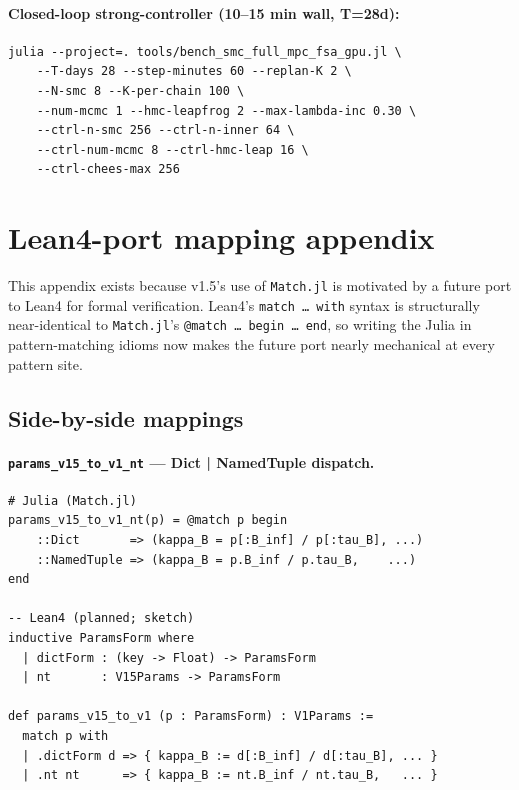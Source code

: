 \documentclass[11pt,a4paper]{article}
\begin{document}
\paragraph{Closed-loop strong-controller (10--15 min wall, T=28d):}

\begin{verbatim}
julia --project=. tools/bench_smc_full_mpc_fsa_gpu.jl \
    --T-days 28 --step-minutes 60 --replan-K 2 \
    --N-smc 8 --K-per-chain 100 \
    --num-mcmc 1 --hmc-leapfrog 2 --max-lambda-inc 0.30 \
    --ctrl-n-smc 256 --ctrl-n-inner 64 \
    --ctrl-num-mcmc 8 --ctrl-hmc-leap 16 \
    --ctrl-chees-max 256
\end{verbatim}

\section{Lean4-port mapping appendix}
\label{sec:lean4}

This appendix exists because v1.5's use of \texttt{Match.jl} is
motivated by a future port to Lean4 for formal verification. Lean4's
\texttt{match \dots\ with} syntax is structurally near-identical
to \texttt{Match.jl}'s \texttt{@match \dots\ begin \dots\ end}, so
writing the Julia in pattern-matching idioms now makes the future
port nearly mechanical at every pattern site.

\subsection{Side-by-side mappings}

\paragraph{\texttt{params\_v15\_to\_v1\_nt} — Dict | NamedTuple dispatch.}

\begin{lstlisting}
# Julia (Match.jl)
params_v15_to_v1_nt(p) = @match p begin
    ::Dict       => (kappa_B = p[:B_inf] / p[:tau_B], ...)
    ::NamedTuple => (kappa_B = p.B_inf / p.tau_B,    ...)
end

-- Lean4 (planned; sketch)
inductive ParamsForm where
  | dictForm : (key -> Float) -> ParamsForm
  | nt       : V15Params -> ParamsForm

def params_v15_to_v1 (p : ParamsForm) : V1Params :=
  match p with
  | .dictForm d => { kappa_B := d[:B_inf] / d[:tau_B], ... }
  | .nt nt      => { kappa_B := nt.B_inf / nt.tau_B,   ... }
\end{lstlisting}
\end{document}
